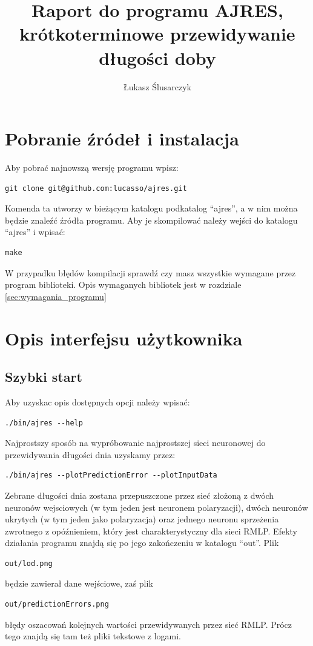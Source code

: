 \documentclass[12pt,a4]{article}
\title{Raport do programu AJRES, krótkoterminowe przewidywanie długości doby}
\author{Łukasz Ślusarczyk}
\begin{document}
\maketitle
\tableofcontents
\clearpage

\section{Pobranie źródeł i instalacja}
Aby pobrać najnowszą wersję programu wpisz:\\
\begin{verbatim}git clone git@github.com:lucasso/ajres.git\end{verbatim}
Komenda ta utworzy w bieżącym katalogu podkatalog ``ajres'', a w nim można będzie znaleźć źródła programu.
Aby je skompilować należy wejści do katalogu ``ajres'' i wpisać:\\
\begin{verbatim}make\end{verbatim}
W przypadku błędów kompilacji sprawdź czy masz wszystkie wymagane przez program biblioteki.
Opis wymaganych bibliotek jest w rozdziale \ref{sec:wymagania_programu}
\section{Opis interfejsu użytkownika}
\subsection{Szybki start}
Aby uzyskac opis dostępnych opcji należy wpisać:\\
\begin{verbatim}./bin/ajres --help\end{verbatim}
Najprostszy sposób na wypróbowanie najprostszej sieci neuronowej do przewidywania długości dnia uzyskamy przez:\\
\begin{verbatim}./bin/ajres --plotPredictionError --plotInputData\end{verbatim}
Zebrane długości dnia zostana przepuszczone przez sieć złożoną z dwóch neuronów wejsciowych (w tym jeden jest neuronem
polaryzacji), dwóch neuronów ukrytych (w tym jeden jako polaryzacja) oraz jednego neuronu sprzeżenia zwrotnego z
opóźnieniem, który jest charakterystyczny dla sieci RMLP. Efekty działania programu znajdą się po jego zakończeniu w
katalogu ``out''. Plik \begin{verbatim}out/lod.png\end{verbatim} będzie zawierał dane wejściowe, zaś plik 
\begin{verbatim}out/predictionErrors.png\end{verbatim} błędy 
oszacowań kolejnych wartości przewidywanych przez sieć RMLP. Prócz tego znajdą się tam też pliki tekstowe z logami.
\end{document}
